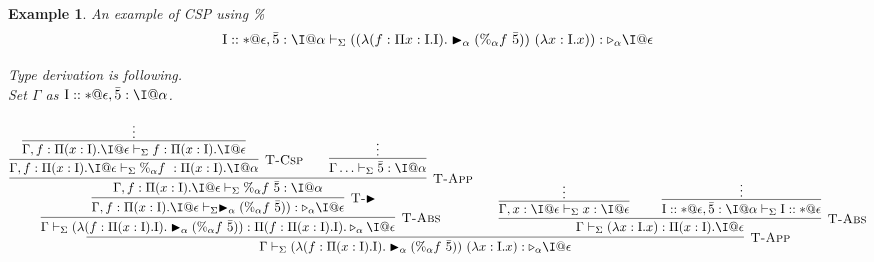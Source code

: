 \documentclass[9pt, a4paper]{extarticle}
\theoremstyle{break}
\newtheorem{ex}{Example}
\newif\iffullversion
\newcommand{\G}{\Gamma}
\newcommand{\V}{\vdash_\Sigma}
\newcommand{\TW}{\triangleright}
\newcommand{\TB}{\blacktriangleright}
\begin{document}
\iffullversion
	\begin{ex}
		\newcommand{\M}{\textrm{M}}
		\newcommand{\I}{\textrm{I}}
		An example of CSP using \%
		\begin{align*}
			\I::*@\epsilon,\bar{5}:\I@\alpha\V ((\lambda(f:\Pi x:\I.\I).\TB_\alpha (\%_\alpha f\ \bar{5}))\ (\lambda x:\I.x)) : \TW_\alpha \I@\epsilon
		\end{align*}

		Type derivation is following.\\
		Set $\G$ as $\I::*@\epsilon,\bar{5}:\I@\alpha$.
		\begin{center}
			$$
				\infer[\textsc{T-App}]
				{\G\V (\lambda(f:\Pi (x:\I).\I).\TB_\alpha (\%_\alpha f\ \bar{5}))\ (\lambda x:\I.x) : \TW_\alpha\I@\epsilon}
				{\infer[\textsc{T-Abs}]
					{\G\V (\lambda(f:\Pi (x:\I).\I).\TB_\alpha (\%_\alpha f\ \bar{5})):\Pi (f:\Pi (x:\I).\I).\TW_\alpha \I@\epsilon}
					{\infer[\textsc{T-$\TB$}]
						{\G ,f:\Pi (x:\I).\I@\epsilon \V \TB_\alpha (\%_\alpha f\ \bar{5})):\TW_\alpha \I@\epsilon}
						{\infer[\textsc{T-App}]
							{\G ,f:\Pi (x:\I).\I@\epsilon \V\%_\alpha f\ \bar{5}: \I@\alpha}
							{\infer[\textsc{T-Csp}]
									{\G ,f:\Pi (x:\I).\I@\epsilon \V \%_\alpha f\ : \Pi (x:\I).\I@\alpha}
									{\infer[]{\G ,f:\Pi (x:\I).\I@\epsilon \V f: \Pi (x:\I).\I@\epsilon}{\vdots}}
								\andalso
								\infer[]
								{\G\ldots \V \bar{5}: \I@\alpha}
								{\vdots}
							}
						}
					}\andalso
					\infer[\textsc{T-Abs}]
					{\G\V(\lambda x:\I.x):\Pi (x:\I).\I@\epsilon}
					{
						\infer[]{\G,x:\I@\epsilon\V x:\I@\epsilon}{\vdots} \andalso \infer[]{\I::*@\epsilon,\bar{5}:\I@\alpha\V\I::*@\epsilon}{\vdots}}}
			$$
		\end{center}
	\end{ex}
\end{document}
